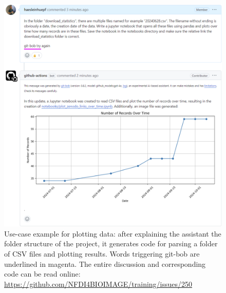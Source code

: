 \documentclass[times, twoside]{zHenriquesLab-StyleBioRxiv}
\begin{document}
\begin{figure}[h]
\centering
\includegraphics[width=\textwidth]{example_plotting.png}
\caption{Use-case example for plotting data: after explaining the assistant the folder structure of the project, it generates code for parsing a folder of CSV files and plotting results. Words triggering git-bob are underlined in magenta. The entire discussion and corresponding code can be read online: \url{https://github.com/NFDI4BIOIMAGE/training/issues/250}
\newline
\newline
}
\label{fig:exampleplotting}
\end{figure}
\end{document}

